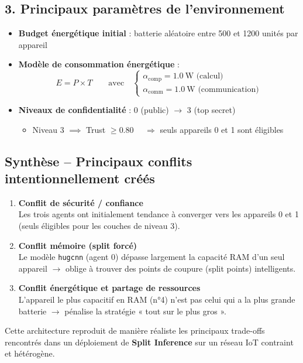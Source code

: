 \documentclass{article}
\begin{document}
\subsection{3. Principaux paramètres de l'environnement}

\begin{itemize}[label=$\bullet$]
    \item \textbf{Budget énergétique initial} : batterie aléatoire entre 500 et 1200 unités par appareil
    \item \textbf{Modèle de consommation énergétique} :
    \[
    E = P \times T \qquad \text{avec} \quad
    \begin{cases}
        \alpha_{\text{comp}} = 1.0~\text{W (calcul)} \\
        \alpha_{\text{comm}} = 1.0~\text{W (communication)}
    \end{cases}
    \]
    \item \textbf{Niveaux de confidentialité} : 0 (public) $\rightarrow$ 3 (top secret)
    \begin{itemize}[label=--]
        \item Niveau 3 $\implies$ Trust $\ge 0.80$ $\quad\Rightarrow$ seuls appareils 0 et 1 sont éligibles
    \end{itemize}
\end{itemize}

\subsection{Synthèse -- Principaux conflits intentionnellement créés}

\begin{enumerate}[label=\arabic*.]
    \item \textbf{Conflit de sécurité / confiance} \\
    Les trois agents ont initialement tendance à converger vers les appareils 0 et 1 (seuls éligibles pour les couches de niveau 3).

    \item \textbf{Conflit mémoire (split forcé)} \\
    Le modèle \texttt{hugcnn} (agent 0) dépasse largement la capacité RAM d’un seul appareil $\rightarrow$ oblige à trouver des points de coupure (split points) intelligents.

    \item \textbf{Conflit énergétique et partage de ressources} \\
    L’appareil le plus capacitif en RAM (n°4) n’est pas celui qui a la plus grande batterie $\rightarrow$ pénalise la stratégie « tout sur le plus gros ».
\end{enumerate}

\bigskip

Cette architecture reproduit de manière réaliste les principaux trade-offs rencontrés dans un déploiement de \textbf{Split Inference} sur un réseau IoT contraint et hétérogène.
\end{document}
